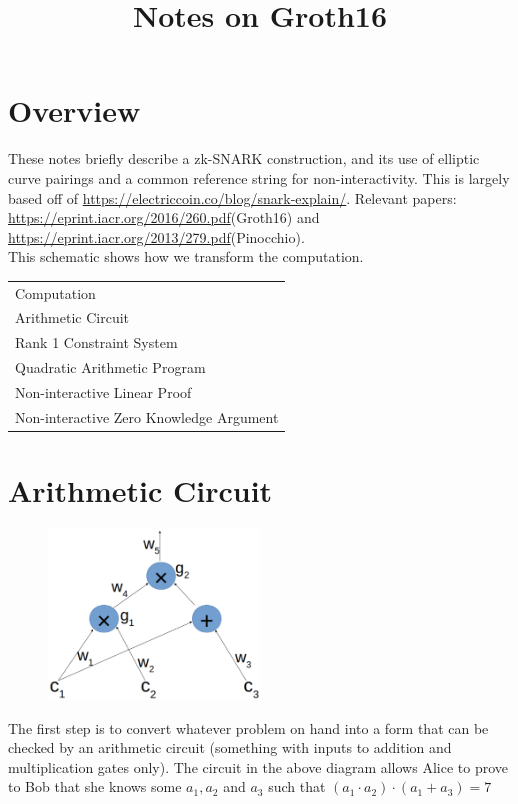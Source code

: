 \documentclass[12pt]{article}
\begin{document}
\title{Notes on Groth16}

\section*{Overview}

These notes briefly describe a zk-SNARK construction, and its
use of elliptic curve pairings and a common reference string for
non-interactivity. This is largely based off of 
\url{https://electriccoin.co/blog/snark-explain/}. Relevant papers:
\url{https://eprint.iacr.org/2016/260.pdf}(Groth16) and
\url{https://eprint.iacr.org/2013/279.pdf}(Pinocchio).\\

This schematic shows how we transform the computation.\\ 


\begin{tabular}{ l }
  Computation \\
  Arithmetic Circuit \\
  Rank 1 Constraint System \\
  Quadratic Arithmetic Program \\
  Non-interactive Linear Proof \\
  Non-interactive Zero Knowledge Argument
\end{tabular}



\section*{Arithmetic Circuit}

\begin{figure}[h]
\includegraphics[width=0.5\textwidth]{circuit}
\end{figure}

The first step is to convert whatever problem on hand into 
a form that can be checked by an arithmetic circuit 
(something with inputs to addition and multiplication gates only).
The circuit in the above diagram allows Alice to prove to 
Bob that she knows some $a_1, a_2$ and $a_3$ such that
$(a_1\cdot a_2)\cdot(a_1+a_3) = 7$
\end{document}
